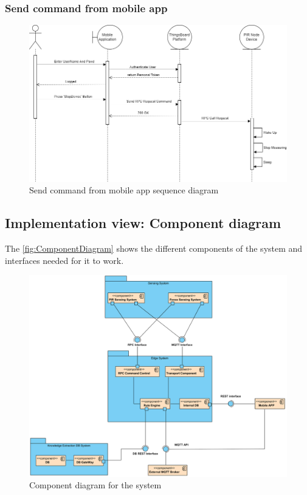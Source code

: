 \subsubsection*{Send command from mobile app}

\begin{figure}[H]
    \centering
    \includegraphics[width=1\textwidth]{./images/6/SendCommandApp.png}
    \caption{Send command from mobile app sequence diagram}
\end{figure}

\clearpage
\subsection{Implementation view: Component diagram}
The \autoref{fig:ComponentDiagram} shows the different components of the system and interfaces needed for it to work.

\begin{figure}[H]
    \centering
    \includegraphics[width=1\textwidth]{./images/6/ComponentesArchitecture.png}
    \caption{Component diagram for the system}
    \label{fig:ComponentDiagram}
\end{figure}



